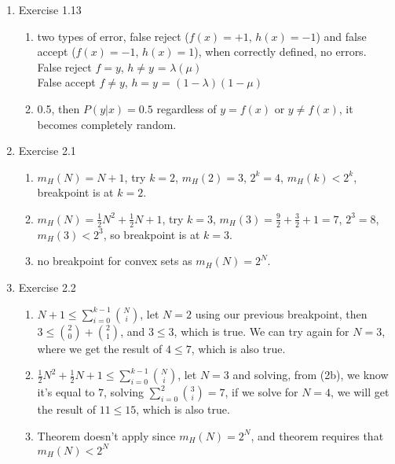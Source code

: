 \documentclass{article}
\begin{document}
    \begin{enumerate}
        \item Exercise 1.13
        \begin{enumerate}[label=(\alph*)]
            \item two types of error, false reject ($f(x) = +1$, $h(x) = -1$) and false accept ($f(x) = -1$, $h(x) = 1$), when correctly defined, no errors.\\
            False reject $f = y$, $h\neq y$ = $\lambda(\mu)$\\
            False accept $f \neq y$, $h = y$ = $(1 - \lambda)(1 - \mu)$
            \item 0.5, then $P(y|x) = 0.5$ regardless of $y = f(x)$ or $y \neq f(x)$, it becomes completely random.
        \end{enumerate}

        \item Exercise 2.1
        \begin{enumerate}[label=(\alph*)]
            \item $m_H(N) = N+1$, try $k = 2$, $m_H(2) = 3$, $2^k = 4$, $m_H(k) < 2^k$, breakpoint is at $k = 2$.
            \item $m_H(N) = \frac{1}{2}N^2 + \frac{1}{2}N + 1$, try $k = 3$, $m_H(3) = \frac{9}{2} + \frac{3}{2} + 1 = 7$, $2^3 = 8$, $m_H(3) < 2^3$, so breakpoint is at $k = 3$.
            \item no breakpoint for convex sets as $m_H(N) = 2^N$.
        \end{enumerate}

        \item Exercise 2.2
        \begin{enumerate}[label=(\alph*)]
            \item $N + 1 \leq \sum_{i = 0}^{k - 1} {N \choose i}$, let $N = 2$ using our previous breakpoint, then $3 \leq {2 \choose 0} + {2 \choose 1}$, and $3 \leq 3$, which is true. We can try again for $N=3$, where we get the result of $4 \leq 7$, which is also true.
            \item $\frac{1}{2}N^2 + \frac{1}{2}N + 1 \leq \sum_{i = 0}^{k - 1} {N \choose i}$, let $N = 3$ and solving, from (2b), we know it's equal to $7$, solving $\sum_{i = 0}^{2} {3 \choose i} = 7$, if we solve for $N =4$, we will get the result of $11 \leq 15$, which is also true.
            \item Theorem doesn't apply since $m_H(N) = 2^N$, and theorem requires that $m_H(N) < 2^N$
        \end{enumerate}


\end{enumerate}
\end{document}
